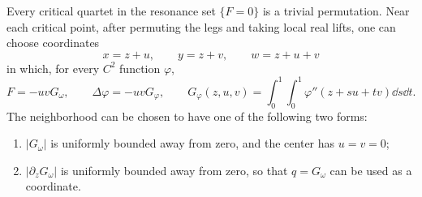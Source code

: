 \begin{lemma}
\label{pin:critical-charts}
Every critical quartet in the resonance set $\{F=0\}$ is a trivial
permutation. Near each critical point, after permuting the legs and
taking local real lifts, one can choose coordinates
\begin{equation}
       x=z+u,\qquad y=z+v,\qquad w=z+u+v
 \label{pin:critical-lift}
\end{equation}
in which, for every $C^2$ function $\varphi$,
\begin{equation}
 F=-uvG_\omega,\qquad \Delta\varphi=-uvG_\varphi,
 \qquad
 G_\varphi(z,u,v)=\int_0^1\int_0^1
                \varphi''(z+su+tv)\dd s\dd t.
 \label{pin:double-difference}
\end{equation}
The neighborhood can be chosen to have one of the following two forms:
\begin{enumerate}
 \item $|G_\omega|$ is uniformly bounded away from zero, and the
       center has $u=v=0$;
 \item $|\partial_zG_\omega|$ is uniformly bounded away from zero,
       so that $q=G_\omega$ can be used as a coordinate.
\end{enumerate}
\end{lemma}

